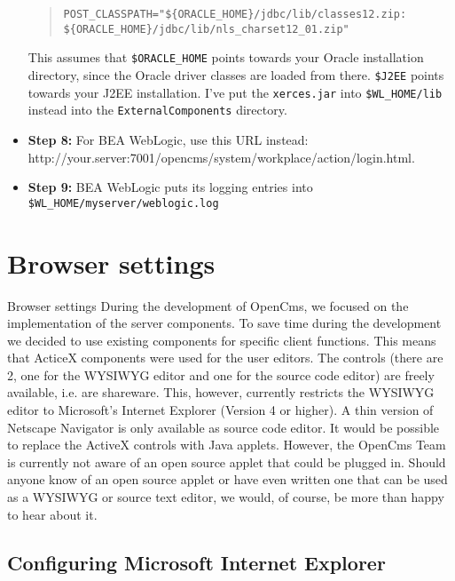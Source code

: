 \begin{itemize}
\begin{quote}
\begin{verbatim}
POST_CLASSPATH="${ORACLE_HOME}/jdbc/lib/classes12.zip:
${ORACLE_HOME}/jdbc/lib/nls_charset12_01.zip"
\end{verbatim}
\end{quote}

This assumes that \texttt{\$ORACLE\_HOME} points towards your Oracle installation
directory, since the Oracle driver classes are loaded from
there. \texttt{\$J2EE} points towards your J2EE installation. I've put the
\texttt{xerces.jar} into \texttt{\$WL\_HOME/lib} instead into the \texttt{ExternalComponents}
directory.

\item \textbf{Step 8:} For BEA WebLogic, use this URL instead: \\
http://your.server:7001/opencms/system/workplace/action/login.html.

\item \textbf{Step 9:} BEA WebLogic puts its logging entries into
\texttt{\$WL\_HOME/myserver/weblogic.log}

\end{itemize}

\section{Browser settings}

Browser settings
During the development of OpenCms, we focused on the implementation of the server components. 
To save time during the development we decided to use existing components for specific client 
functions. This means that ActiceX components were used for the user editors. 
The controls (there are 2, one for the WYSIWYG editor and one for the source code editor) 
are freely available, i.e. are shareware. This, however, currently restricts the WYSIWYG 
editor to Microsoft's Internet Explorer (Version 4 or higher). 
A thin version of Netscape Navigator is only available 
as source code editor. It would be possible to replace the ActiveX controls with Java applets. 
However, the OpenCms Team is currently not aware of an open source applet that could be 
plugged in. 
Should anyone know of an open source applet or have even  written one that can be used as a 
WYSIWYG  or source text editor,  we would, of course, be more than happy to hear about it.

\subsection{Configuring Microsoft Internet Explorer} 

